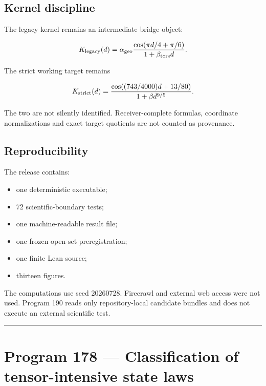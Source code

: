 \documentclass[11pt,a4paper,openany]{report}
\begin{document}
\section{Kernel discipline}

The legacy kernel remains an intermediate bridge object:

\[
K_{\rm legacy}(d)
=
\alpha_{\rm geo}
\frac{\cos(\pi d/4+\pi/6)}
{1+\beta_{\rm tors}d}.
\]

The strict working target remains

\[
K_{\rm strict}(d)
=
\frac{\cos((743/4000)d+13/80)}
{1+\beta d^{9/5}}.
\]

The two are not silently identified. Receiver-complete formulas, coordinate normalizations and exact target quotients are not counted as provenance.

\section{Reproducibility}

The release contains:

\begin{itemize}
\item 
one deterministic executable;

\item 
72 scientific-boundary tests;

\item 
one machine-readable result file;

\item 
one frozen open-set preregistration;

\item 
one finite Lean source;

\item 
thirteen figures.

\end{itemize}

The computations use seed 20260728. Firecrawl and external web access were not used. Program 190 reads only repository-local candidate bundles and does not execute an external scientific test.

\par\medskip\hrule\medskip

\chapter{Program 178 --- Classification of tensor-intensive state laws}
\end{document}
